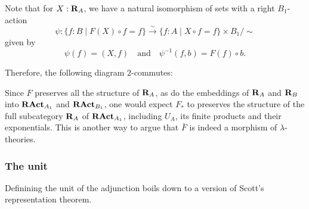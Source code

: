\begin{remark}
  Note that for $ X : \mathbf{R}_A $, we have a natural isomorphism of sets with a right $ B_1 $-action
  \[ \psi: \{ f : B \mid F(X) \circ f = f \} \xrightarrow \sim \{ f : A \mid X \circ f = f \} \times B_1 / \sim \]
  given by
  \[ \psi(f) = (X, f) \quad \text{and} \quad \psi^{-1}(f, b) = F(f) \circ b. \]

  Therefore, the following diagram $ 2 $-commutes:
  \begin{center}
  \end{center}
  Since $ F $ preserves all the structure of $ \mathbf{R}_A $, as do the embeddings of $ \mathbf{R}_A $ and $ \mathbf{R}_B $ into $ \mathbf{RAct}_{A_1} $ and $ \mathbf{RAct}_{B_1} $, one would expect $ F_* $ to preserves the structure of the full subcategory $ \mathbf{R}_A $ of $ \mathbf{RAct}_{A_1} $, including $ U_A $, its finite products and their exponentials. This is another way to argue that $ \bar F $ is indeed a morphism of $ \lambda $-theories.
\end{remark}

\subsubsection{The unit}

Definining the unit of the adjunction boils down to a version of Scott's representation theorem.

